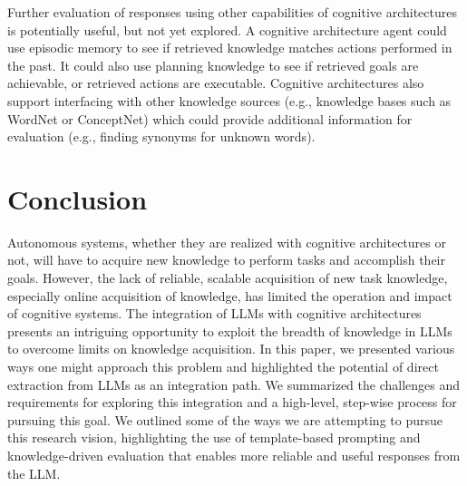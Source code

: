 \documentclass[letterpaper]{article} %
\begin{document}
\vspace{-1.79mm}
Further evaluation of responses using other capabilities of cognitive architectures is potentially useful, but not yet explored. A cognitive architecture agent could use episodic memory to see if retrieved knowledge matches actions performed in the past. It could also use planning knowledge to see if retrieved goals are achievable, or retrieved actions are executable. Cognitive architectures also support interfacing with other knowledge sources (e.g., knowledge bases such as WordNet or ConceptNet) which could provide additional information for evaluation (e.g., finding synonyms for unknown words).


\vspace{-1.77mm}
\section{Conclusion}

Autonomous systems, whether they are realized with cognitive architectures or not, will have to acquire new knowledge to perform tasks and accomplish their goals.
However, the lack of reliable, scalable acquisition of new task knowledge, especially online acquisition of knowledge, has limited the operation and impact of cognitive systems. The integration of LLMs with cognitive architectures presents an intriguing opportunity to exploit the breadth of knowledge in LLMs to overcome limits on knowledge acquisition.  In this paper, we presented various ways one might approach this problem and highlighted the potential of direct extraction from LLMs as an integration path. We summarized the challenges and requirements for exploring this integration and a high-level, step-wise process for pursuing this goal. We outlined some of the ways we are attempting to pursue this research vision, highlighting the use of template-based prompting and knowledge-driven evaluation that enables more reliable and useful responses from the LLM.
\end{document}
